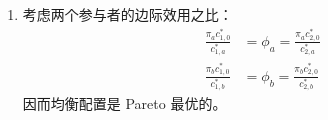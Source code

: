 \begin{solution}
\begin{enumerate}[label=(\alph*)]
\[\begin{aligned}
            \phi_{b}&=\frac{\pi_{b}e_{0}^{1-\alpha}}{\lambda_{b}\alpha^{\alpha}(1+\alpha)^{1-\alpha}}
        \end{aligned}
    \]
    最优的生产投入为 $I^{*}=\frac{\alpha e_{0}}{1+\alpha}$，最优消费为
    \[
        \begin{aligned}
            c_{1,0}^{*}&=\frac{1-\alpha}{2(1+\alpha)}e_{0},\quad c_{2,0}^{*}=\tfrac12 e_{0},\quad C_{0}^{*}=\frac{1}{1+\alpha}e_{0}\\
            c_{1,a}^{*}&=\frac{\pi_{a}}{2\phi_{a}}\frac{1-\alpha}{1+\alpha}e_{0},\quad c_{2,a}^{*}=\frac{\pi_{a}}{2\phi_{a}}e_{0},\quad C_{a}^{*}=\lambda_{a}\Bigl(\frac{\alpha e_{0}}{1+\alpha}\Bigr)^{\alpha}\\
            c_{1,b}^{*}&=\frac{\pi_{b}}{2\phi_{b}}\frac{1-\alpha}{1+\alpha}e_{0},\quad c_{2,b}^{*}=\frac{\pi_{b}}{2\phi_{b}}e_{0},\quad C_{b}^{*}=\lambda_{b}\Bigl(\frac{\alpha e_{0}}{1+\alpha}\Bigr)^{\alpha}
        \end{aligned}
    \]
    \item 考虑两个参与者的边际效用之比：
    \[
        \begin{aligned}
            \frac{\pi_{a}c_{1,0}^{*}}{c_{1,a}^{*}}&=\phi_{a}=\frac{\pi_{a}c_{2,0}^{*}}{c_{2,a}^{*}}\\
            \frac{\pi_{b}c_{1,0}^{*}}{c_{1,b}^{*}}&=\phi_{b}=\frac{\pi_{b}c_{2,0}^{*}}{c_{2,b}^{*}}
        \end{aligned}
    \]
    因而均衡配置是 Pareto 最优的。
\end{enumerate}
\end{solution}

